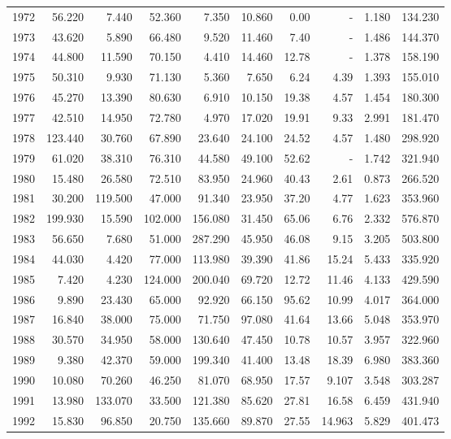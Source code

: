 \documentclass[
]{scrartcl}
\begin{document}
\begin{longtable}{rrrrrrrrrr}
1972 & 56.220 & 7.440 & 52.360 & 7.350 & 10.860 & 0.00 &  -  & 1.180 & 134.230 \\ 
1973 & 43.620 & 5.890 & 66.480 & 9.520 & 11.460 & 7.40 &  -  & 1.486 & 144.370 \\ 
1974 & 44.800 & 11.590 & 70.150 & 4.410 & 14.460 & 12.78 &  -  & 1.378 & 158.190 \\ 
1975 & 50.310 & 9.930 & 71.130 & 5.360 & 7.650 & 6.24 & 4.39 & 1.393 & 155.010 \\ 
1976 & 45.270 & 13.390 & 80.630 & 6.910 & 10.150 & 19.38 & 4.57 & 1.454 & 180.300 \\ 
1977 & 42.510 & 14.950 & 72.780 & 4.970 & 17.020 & 19.91 & 9.33 & 2.991 & 181.470 \\ 
1978 & 123.440 & 30.760 & 67.890 & 23.640 & 24.100 & 24.52 & 4.57 & 1.480 & 298.920 \\ 
1979 & 61.020 & 38.310 & 76.310 & 44.580 & 49.100 & 52.62 &  -  & 1.742 & 321.940 \\ 
1980 & 15.480 & 26.580 & 72.510 & 83.950 & 24.960 & 40.43 & 2.61 & 0.873 & 266.520 \\ 
1981 & 30.200 & 119.500 & 47.000 & 91.340 & 23.950 & 37.20 & 4.77 & 1.623 & 353.960 \\ 
1982 & 199.930 & 15.590 & 102.000 & 156.080 & 31.450 & 65.06 & 6.76 & 2.332 & 576.870 \\ 
1983 & 56.650 & 7.680 & 51.000 & 287.290 & 45.950 & 46.08 & 9.15 & 3.205 & 503.800 \\ 
1984 & 44.030 & 4.420 & 77.000 & 113.980 & 39.390 & 41.86 & 15.24 & 5.433 & 335.920 \\ 
1985 & 7.420 & 4.230 & 124.000 & 200.040 & 69.720 & 12.72 & 11.46 & 4.133 & 429.590 \\ 
1986 & 9.890 & 23.430 & 65.000 & 92.920 & 66.150 & 95.62 & 10.99 & 4.017 & 364.000 \\ 
1987 & 16.840 & 38.000 & 75.000 & 71.750 & 97.080 & 41.64 & 13.66 & 5.048 & 353.970 \\ 
1988 & 30.570 & 34.950 & 58.000 & 130.640 & 47.450 & 10.78 & 10.57 & 3.957 & 322.960 \\ 
1989 & 9.380 & 42.370 & 59.000 & 199.340 & 41.400 & 13.48 & 18.39 & 6.980 & 383.360 \\ 
1990 & 10.080 & 70.260 & 46.250 & 81.070 & 68.950 & 17.57 & 9.107 & 3.548 & 303.287 \\ 
1991 & 13.980 & 133.070 & 33.500 & 121.380 & 85.620 & 27.81 & 16.58 & 6.459 & 431.940 \\ 
1992 & 15.830 & 96.850 & 20.750 & 135.660 & 89.870 & 27.55 & 14.963 & 5.829 & 401.473 \\ 

\end{longtable}
\end{document}
